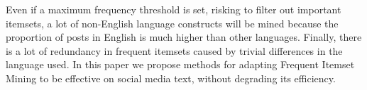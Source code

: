 \documentclass{sig-alternate}
\begin{document}
Even if a maximum frequency threshold is set, risking to filter out important itemsets, a lot of non-English language constructs will be mined because the proportion of posts in English is much higher than other languages.
Finally, there is a lot of redundancy in frequent itemsets caused by trivial differences in the language used.
 In this paper we propose methods for adapting Frequent Itemset Mining to be effective on social media text, without degrading its efficiency. %
\end{document}
